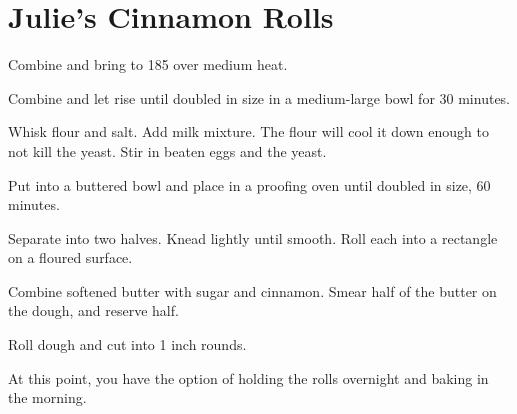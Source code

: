 \section{Julie's Cinnamon Rolls}
\begin{recipe}



Combine and bring to 185\degree{} over medium heat.


Combine and let rise until doubled in size in a medium-large bowl for 30 minutes.


Whisk flour and salt. Add milk mixture. The flour will cool it down enough 
to not kill the yeast. Stir in beaten eggs and the yeast. 

Put into a buttered bowl and place in a proofing oven until doubled in size, 
60 minutes. 

Separate into two halves. Knead lightly until smooth. 
Roll each into a rectangle on a floured surface. 


Combine softened butter with sugar and cinnamon.
Smear half of the butter on the dough, and reserve half. 

Roll dough and cut into 1 inch rounds. 

At this point, you have the option of holding the rolls overnight 
and baking in the morning.


\end{recipe}
